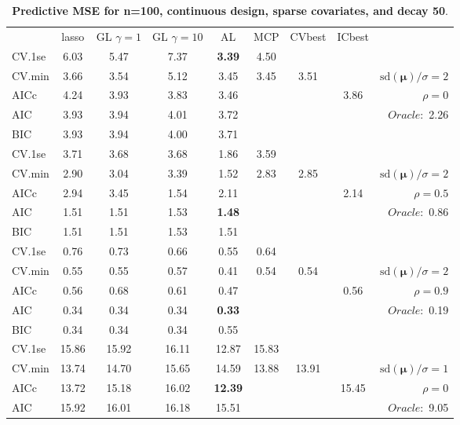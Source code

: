 \begin{table}\vspace{-.5cm}
\caption[l]{ { \bf Predictive MSE for n=100, continuous design, 
sparse covariates, and  decay  50}.}
\vspace{-.5cm}
\footnotesize{}
\begin{center}
\begin{tabular}{l*{7}{c}|r}
 & lasso & GL $\gamma=1$ & GL $\gamma=10$ & AL & MCP  & CVbest & ICbest  \\
\cline{1-9}
CV.1se & 6.03 & 5.47 & 7.37 & {\bf 3.39} & 4.50 & & & \\
CV.min & 3.66 & 3.54 & 5.12 & 3.45 & 3.45 & 3.51 & & $\mathrm{sd}(\mathbf{\mu})/\sigma=2$ \\
AICc & 4.24 & 3.93 & 3.83 & 3.46 & & & 3.86 &  $\rho=0$ \\
AIC & 3.93 & 3.94 & 4.01 & 3.72 & & & &  \multirow{2}{*}{$Oracle: $ 2.26} \\
BIC & 3.93 & 3.94 & 4.00 & 3.71 & & & &  \\
 \hline 
CV.1se & 3.71 & 3.68 & 3.68 & 1.86 & 3.59 & & & \\
CV.min & 2.90 & 3.04 & 3.39 & 1.52 & 2.83 & 2.85 & & $\mathrm{sd}(\mathbf{\mu})/\sigma=2$ \\
AICc & 2.94 & 3.45 & 1.54 & 2.11 & & & 2.14 &  $\rho=0.5$ \\
AIC & 1.51 & 1.51 & 1.53 & {\bf 1.48} & & & &  \multirow{2}{*}{$Oracle: $ 0.86} \\
BIC & 1.51 & 1.51 & 1.53 & 1.51 & & & &  \\
 \hline 
CV.1se & 0.76 & 0.73 & 0.66 & 0.55 & 0.64 & & & \\
CV.min & 0.55 & 0.55 & 0.57 & 0.41 & 0.54 & 0.54 & & $\mathrm{sd}(\mathbf{\mu})/\sigma=2$ \\
AICc & 0.56 & 0.68 & 0.61 & 0.47 & & & 0.56 &  $\rho=0.9$ \\
AIC & 0.34 & 0.34 & 0.34 & {\bf 0.33} & & & &  \multirow{2}{*}{$Oracle: $ 0.19} \\
BIC & 0.34 & 0.34 & 0.34 & 0.55 & & & &  \\
 \hline 
CV.1se & 15.86 & 15.92 & 16.11 & 12.87 & 15.83 & & & \\
CV.min & 13.74 & 14.70 & 15.65 & 14.59 & 13.88 & 13.91 & & $\mathrm{sd}(\mathbf{\mu})/\sigma=1$ \\
AICc & 13.72 & 15.18 & 16.02 & {\bf 12.39} & & & 15.45 &  $\rho=0$ \\
AIC & 15.92 & 16.01 & 16.18 & 15.51 & & & &  \multirow{2}{*}{$Oracle: $ 9.05} \\

\end{tabular}
\end{center}
\end{table}
